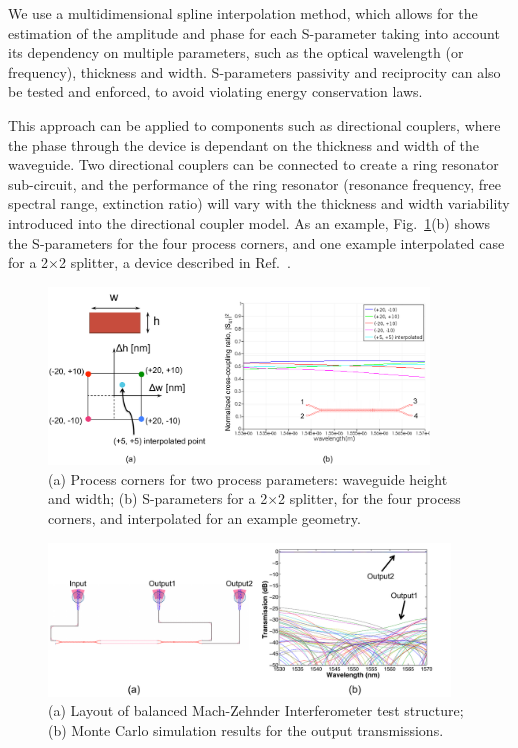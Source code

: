 \documentclass[journal]{spie}
\begin{document}
We use a multidimensional spline interpolation method, which allows for the estimation of the amplitude and phase for each S-parameter taking into account its dependency on multiple parameters, such as the optical wavelength (or frequency), thickness and width.  S-parameters passivity and reciprocity can also be tested and enforced, to avoid violating energy conservation laws.  

This approach can be applied to components such as directional couplers, where the phase through the device is dependant on the thickness and width of the waveguide.  Two directional couplers can be connected to create a ring resonator sub-circuit, and the performance of the ring resonator (resonance frequency, free spectral range, extinction ratio) will vary with the thickness and width variability introduced into the directional coupler model.  As an example, Fig.~\ref{s-interpolation}(b) shows the S-parameters for the four process corners, and one example interpolated case for a 2$\times$2 splitter, a device described in Ref.~. 


\begin{figure}[tbp]
	\centering
	\includegraphics[width=0.9\textwidth]{../figs_paper/S_Interpolation.pdf}
    \caption[]{(a) Process corners for two process parameters: waveguide height and width; (b) S-parameters for  a 2$\times$2  splitter, for the four process corners, and interpolated for an example geometry.}
    \label{s-interpolation}
\end{figure}

\begin{figure}[tbp]
	\centering
	\includegraphics[width=0.95\textwidth]{../figs_paper/MZI_common_MC.pdf}
    \caption[]{(a) Layout of balanced Mach-Zehnder Interferometer test structure; (b) Monte Carlo simulation results for the output transmissions.}
    \label{MZI_common_MC}
\end{figure}
\end{document}
